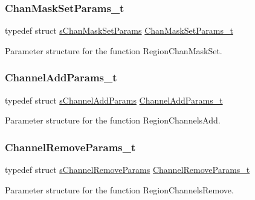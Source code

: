 \subsubsection{\texorpdfstring{Chan\+Mask\+Set\+Params\+\_\+t}{ChanMaskSetParams\_t}}
{\footnotesize\ttfamily typedef struct \hyperlink{structsChanMaskSetParams}{s\+Chan\+Mask\+Set\+Params} \hyperlink{group__REGION_ga6d24f7da136006410827dfb29f6b9b9e}{Chan\+Mask\+Set\+Params\+\_\+t}}

Parameter structure for the function Region\+Chan\+Mask\+Set. \mbox{\label{group__REGION_gab1c5f3aa06614283202906cef4417860}} 
\subsubsection{\texorpdfstring{Channel\+Add\+Params\+\_\+t}{ChannelAddParams\_t}}
{\footnotesize\ttfamily typedef struct \hyperlink{structsChannelAddParams}{s\+Channel\+Add\+Params} \hyperlink{group__REGION_gab1c5f3aa06614283202906cef4417860}{Channel\+Add\+Params\+\_\+t}}

Parameter structure for the function Region\+Channels\+Add. \mbox{\label{group__REGION_gaa37468560d2fc81a977b57a48e5d72c0}} 
\subsubsection{\texorpdfstring{Channel\+Remove\+Params\+\_\+t}{ChannelRemoveParams\_t}}
{\footnotesize\ttfamily typedef struct \hyperlink{structsChannelRemoveParams}{s\+Channel\+Remove\+Params} \hyperlink{group__REGION_gaa37468560d2fc81a977b57a48e5d72c0}{Channel\+Remove\+Params\+\_\+t}}

Parameter structure for the function Region\+Channels\+Remove. \mbox{\label{group__REGION_ga933f695eea70935418e2175940b92311}} 

